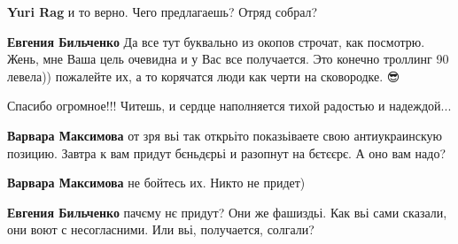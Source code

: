\begin{itemize}
\begin{itemize}
\textbf{Yuri Rag} и то верно. Чего предлагаешь? Отряд собрал?

 
\textbf{Евгения Бильченко} Да все тут буквально из окопов строчат, как посмотрю. Жень, мне Ваша цель очевидна и у Вас все получается. Это конечно троллинг 90 левела)) пожалейте их, а то корячатся люди как черти на сковородке. 😎
\end{itemize}

 

Спасибо огромное!!! Читешь, и сердце наполняется тихой радостью и надеждой...

\begin{itemize}
 
\textbf{Варвара Максимова} от зря вьі так открьіто показьіваете свою антиукраинскую позицию.
Завтра к вам придут бєньдєрьі и разопнут на бєтєєрє.
А оно вам надо?

 
\textbf{Варвара Максимова} не бойтесь их. Никто не придет)

 
\textbf{Евгения Бильченко} пачєму нє придут? Они же фашиздьі. Как вьі сами сказали, они воют с несогласними.
Или вьі, получается, солгали?


\end{itemize}
\end{itemize}
